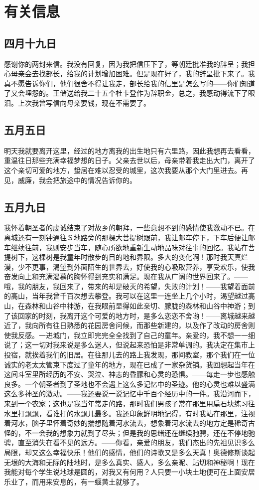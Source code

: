 \documentclass[12pt,oneside]{book}
\begin{document}
\part{有关信息}
\chapter{四月十九日}
感谢你的两封来信。我没有回复，因为我把信压下了，等朝廷批准我的辞呈；我担心母亲会去找部长，给我的计划增加困难。但是现在好了，我的辞呈批下来了。我真不愿告诉你们，他们很舍不得让我走，部长给我的信里是怎么写的——你们知道了又会埋怨的。王储送给我二十五个杜卡登作为辞职金，总之，我感动得流下了眼泪。上次我曾写信向母亲要钱，现在不需要了。
　　

\chapter{五月五日}
明天我就要离开这里，经过的地方离我的出生地只有六里路，因此我想再去看看，重温往日那些充满幸福梦想的日子。父亲去世以后，母亲带着我走出大门，离开了这个亲切可爱的地方，蛰居在难以忍受的城里，这次我要从那个大门里进去。再见，威廉，我会把旅途中的情况告诉你的。
　　

\chapter{五月九日}
我怀着朝圣者的虔诚结束了对故乡的朝拜，一些意想不到的感情使我激动不已。在离城还有一刻钟通往Ｓ地路旁的那棵大菩提树跟前，我让邮车停下，下车后便让邮车继续往前，我则安步当车，随心所欲地重新生动地品味对往事的回忆。我站在菩提树下，这棵树是我童年时散步的目的地和界限。多大的变化啊！那时我天真烂漫，少不更事，渴望到外面陌生的世界去，好使我的心吸取营养，享受欢乐，使我奋发向上和充满渴慕的胸怀得到充实和满足。现在我从广阔的世界回来了。——哦，我的朋友，我回来了，带来的却是破灭的希望，失败的计划！——我望着面前的高山，当年我曾千百次想去攀登。我可以在这里一连坐上几个小时，渴望越过高山，在森林和山谷中神游，在我眼前显得如此亲切、朦胧的森林和山谷中神游；到了该回家的时刻，我离开这个可爱的地方时，是多么恋恋不舍哟！——离城越来越近了，我向所有往日熟悉的花园房舍问候，而那些新建的，以及作了改动的房舍则使我反感。一进城门，我立即完完全全找到了自己的童年。亲爱的，我不想一一细说了；这一切对我来说是多么迷人，但说起来恐怕是非常单调的。我决定在集市上投宿，就挨着我们的旧居。在往那儿去的路上我发现，那间教室，那个我们在一位诚实的老太太管束下度过了童年的地方，现在已成了一家杂货铺。我回想起当年在这间斗室里所经历的不安、哭泣、神志的昏朦和心灵的恐惧。——每走一步也感触良多。一个朝圣者到了圣地也不会遇上这么多记忆中的圣迹。他的心灵也难以盛满这么多神圣的激动。——我还要说一说记忆中千百个经历中的一件。我沿河而下，来到一个农家；这也是我当年常走的路，那时我们男孩子常在那里用扁石块练习往水里打飘飘，看谁打的水飘儿最多。我还印象鲜明地记得，有时我站在那里，注视着河水，脑子里怀着奇妙的揣想随着河水流去，想象着河水流去的地方定是稀奇古怪的，不一会我的想象力就到了尽头；但是我的思绪还在继续驰骋，还在不停地驰骋，直至消失在看不见的远方。——你看，亲爱的朋友，我们杰出的先祖见识多么局限，却又这么幸福快乐！他们的感情，他们的诗歌又是多么天真！奥德修斯谈起无垠的大海和无际的陆地时，是多么真实、感人，多么亲昵、贴切和神秘啊！现在我能对每个学生说地球是圆的，对我又有何用？人只要一小块土地便可在上面安居乐业了，而用来安息的，有一蝘黄土就够了。
\end{document}

